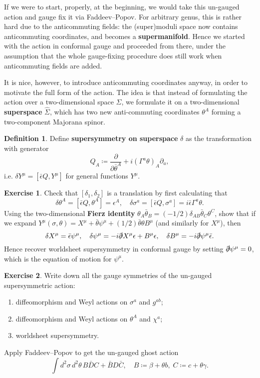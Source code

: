 \documentclass{report}
\theoremstyle{plain}
\theoremstyle{definition}
\newtheorem{definition}[theorem]{Definition}
\newtheorem{exercise}{Exercise}[section]
\theoremstyle{remark}
\newcommand{\di}{\partial}
\newcommand{\pder}[2]{\frac{\partial #1}{\partial #2}}
\begin{document}
If we were to start, properly, at the beginning, we would take this
un-gauged action and gauge fix it via Faddeev--Popov. For arbitrary
genus, this is rather hard due to the anticommuting fields: the
(super)moduli space now contains anticommuting coordinates, and
becomes a {\bf supermanifold}. Hence we started with the action in
conformal gauge and proceeded from there, under the assumption that
the whole gauge-fixing procedure does still work when anticommuting
fields are added.

It is nice, however, to introduce anticommuting coordinates anyway, in
order to motivate the full form of the action. The idea is that
instead of formulating the action over a two-dimensional space
$\Sigma$, we formulate it on a two-dimensional {\bf superspace}
$\hat{\Sigma}$, which has two new anti-commuting coordinates
$\theta^A$ forming a two-component Majorana spinor.

\begin{definition}
  Define {\bf supersymmetry on superspace} $\delta$ as the
  transformation with generator
  \[ Q_A \coloneqq \pder{}{\bar{\theta}^A} + i(\Gamma^a\theta)_A \di_a, \]
  i.e. $\delta Y^\mu = [\bar{\epsilon}Q, Y^\mu]$ for general functions
  $Y^\mu$.
\end{definition}

\begin{exercise}
  Check that $[\delta_1, \delta_2]$ is a translation by first
  calculating that
  \[ \delta \theta^A = [\bar{\epsilon}Q, \theta^A] = \epsilon^A, \quad \delta \sigma^a = [\bar{\epsilon}Q, \sigma^a] = i\bar{\epsilon}\Gamma^a \theta. \]
  Using the two-dimensional {\bf Fierz identity} $\theta_A
  \bar{\theta}_B = (-1/2)\delta_{AB}\bar{\theta}_C \theta^C$, show
  that if we expand $Y^\mu(\sigma, \theta) = X^\mu + \bar{\theta}
  \psi^\mu + (1/2)\bar{\theta} \theta B^\mu$ (and similarly for
  $X^\mu$), then
  \[ \delta X^\mu = \bar{\epsilon}\psi^\mu, \quad \delta \psi^\mu = -i \slashed{\di} X^\mu \epsilon + B^\mu \epsilon, \quad \delta B^\mu = -i \slashed{\di} \psi^\mu \bar{\epsilon}. \]
  Hence recover worldsheet supersymmetry in conformal gauge by setting
  $\slashed{\di}\psi^\mu = 0$, which is the equation of motion for
  $\psi^\mu$.
\end{exercise}

\begin{exercise}
  Write down all the gauge symmetries of the un-gauged supersymmetric
  action:
  \begin{enumerate}
  \item diffeomorphism and Weyl actions on $\sigma^a$ and $g^{ab}$;
  \item diffeomorphism and Weyl actions on $\theta^A$ and $\chi^a$;
  \item worldsheet supersymmetry.
  \end{enumerate}
  Apply Faddeev--Popov to get the un-gauged ghost action
  \[ \int d^2\sigma \, d^2\theta \, B \bar{D} C + \bar{B} D \bar{C}, \quad B \coloneqq \beta + \theta b, \; C \coloneqq c + \theta \gamma. \]
\end{exercise}
\end{document}
